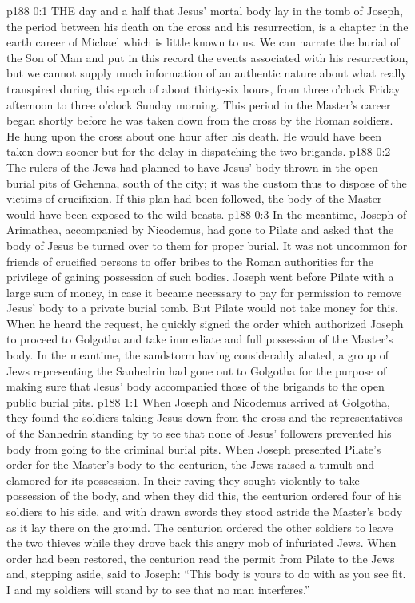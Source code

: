 \vs p188 0:1 THE day and a half that Jesus’ mortal body lay in the tomb of Joseph, the period between his death on the cross and his resurrection, is a chapter in the earth career of Michael which is little known to us. We can narrate the burial of the Son of Man and put in this record the events associated with his resurrection, but we cannot supply much information of an authentic nature about what really transpired during this epoch of about thirty\hyp{}six hours, from three o’clock Friday afternoon to three o’clock Sunday morning. This period in the Master’s career began shortly before he was taken down from the cross by the Roman soldiers. He hung upon the cross about one hour after his death. He would have been taken down sooner but for the delay in dispatching the two brigands.
\vs p188 0:2 The rulers of the Jews had planned to have Jesus’ body thrown in the open burial pits of Gehenna, south of the city; it was the custom thus to dispose of the victims of crucifixion. If this plan had been followed, the body of the Master would have been exposed to the wild beasts.
\vs p188 0:3 In the meantime, Joseph of Arimathea, accompanied by Nicodemus, had gone to Pilate and asked that the body of Jesus be turned over to them for proper burial. It was not uncommon for friends of crucified persons to offer bribes to the Roman authorities for the privilege of gaining possession of such bodies. Joseph went before Pilate with a large sum of money, in case it became necessary to pay for permission to remove Jesus’ body to a private burial tomb. But Pilate would not take money for this. When he heard the request, he quickly signed the order which authorized Joseph to proceed to Golgotha and take immediate and full possession of the Master’s body. In the meantime, the sandstorm having considerably abated, a group of Jews representing the Sanhedrin had gone out to Golgotha for the purpose of making sure that Jesus’ body accompanied those of the brigands to the open public burial pits.
\vs p188 1:1 When Joseph and Nicodemus arrived at Golgotha, they found the soldiers taking Jesus down from the cross and the representatives of the Sanhedrin standing by to see that none of Jesus’ followers prevented his body from going to the criminal burial pits. When Joseph presented Pilate’s order for the Master’s body to the centurion, the Jews raised a tumult and clamored for its possession. In their raving they sought violently to take possession of the body, and when they did this, the centurion ordered four of his soldiers to his side, and with drawn swords they stood astride the Master’s body as it lay there on the ground. The centurion ordered the other soldiers to leave the two thieves while they drove back this angry mob of infuriated Jews. When order had been restored, the centurion read the permit from Pilate to the Jews and, stepping aside, said to Joseph: “This body is yours to do with as you see fit. I and my soldiers will stand by to see that no man interferes.”
